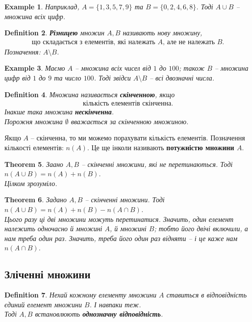 \documentclass[a4paper, 10pt]{article}
\theoremstyle{theoremdd}
\newtheorem{theorem}{Theorem}[subsection]
\theoremstyle{theoremdd}
\newtheorem{definition}[theorem]{Definition}
\theoremstyle{theoremdd}
\theoremstyle{theoremdd}
\newtheorem{example}[theorem]{Example}
\theoremstyle{theoremdd}
\theoremstyle{theoremdd}
\theoremstyle{theoremdd}
\theoremstyle{theoremdd}
\begin{document}
\begin{example}
Наприклад, $A = \{1,3,5,7,9\}$ та $B = \{0, 2,4,6,8\}$. Тоді $A \cup B$ -- множина всіх цифр.
\end{example}

\begin{definition}
\textbf{Різницею} множин $A,B$ називають нову множину,
\begin{align*}
\text{що складається з елементів, які належать $A$, але не належать $B$.}
\end{align*}
Позначення: $A \setminus B$.
\end{definition}

\begin{example}
Маємо $A$ -- множина всіх чисел від $1$ до $100$; також $B$ -- множина цифр від $1$ до $9$ та число $100$. Тоді звідси $A \setminus B$ -- всі двозначні числа.
\end{example}

\begin{definition}
Множина називається \textbf{скінченною}, якщо
\begin{align*}
\text{кількість елементів скінченна}.
\end{align*}
Інакше така множина \textbf{нескінченна}.\\
Порожня множина $\emptyset$ вважається за скінченною множиною.
\end{definition}

Якщо $A$ -- скінченна, то ми можемо порахувати кількість елементів. Позначення кількості елементів: $n(A)$. Це ще інколи називають \textbf{потужністю множини $A$}.

\begin{theorem}
Заано $A,B$ -- скінченні множини, які не перетинаються. Тоді \\
$n(A \cup B) = n(A) + n(B)$.\\
\textit{Цілком зрозуміло.}
\end{theorem}

\begin{theorem}
Задано $A,B$ -- скінченні множини. Тоді $n(A \cup B) = n(A) + n(B) - n(A \cap B)$.\\
\textit{Цього разу ці дві множини можуть перетинатися. Значить, один елемент належить одночасно й множині $A$, й множині $B$; тобто його двічі включили, а нам треба один раз. Значить, треба його один раз відняти -- і це каже нам $n(A \cap B)$.}
\end{theorem}

\subsection{Зліченні множини}
\begin{definition}
Нехай кожному елементу множини $A$ ставиться в відповідність єдиний елемент множини $B$. І навпаки теж.\\
Тоді $A,B$ встановлюють \textbf{однозначну відповідність}.
\end{definition}
\end{document}
